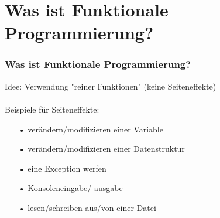 	\section[Section]{Was ist Funktionale Programmierung?}
		\begin{frame}
			\frametitle{Was ist Funktionale Programmierung?}
				Idee:
				Verwendung "reiner Funktionen"  (keine Seiteneffekte) \\
				\leavevmode \\
				Beispiele für Seiteneffekte:
				\begin{itemize}
				\item[•] verändern/modifizieren einer Variable
				\item[•] verändern/modifizieren einer Datenstruktur
				\item[•] eine Exception werfen
				\item[•] Konsoleneingabe/-ausgabe
				\item[•] lesen/schreiben aus/von einer Datei
				\end{itemize}
		\end{frame}